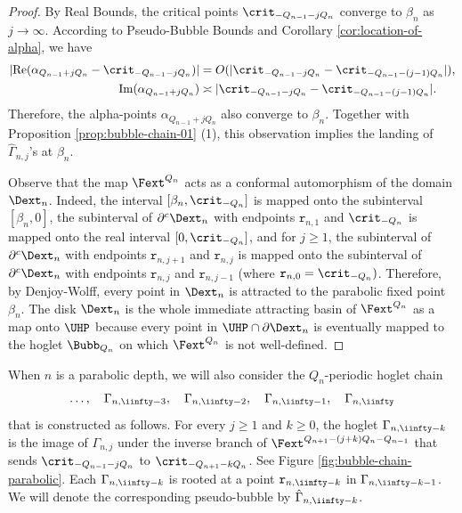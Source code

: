 \documentclass{amsart}
\begin{document}
\begin{proof}
    By Real Bounds, the critical points $\crit_{-Q_{n-1}-jQ_n}$ converge to $\beta_n$ as $j \to \infty$. 
    According to Pseudo-Bubble Bounds and Corollary \ref{cor:location-of-alpha}, we have
    \begin{align*}
        |\text{Re} (\alpha_{Q_{n-1} + j Q_n} - \crit_{-Q_{n-1} - jQ_n})|
        &= O( |\crit_{-Q_{n-1} - jQ_n} - \crit_{-Q_{n-1} - (j-1) Q_n}|), \\
        \text{Im} (\alpha_{Q_{n-1}+ j Q_n}) &\asymp |\crit_{-Q_{n-1} - jQ_n} - \crit_{-Q_{n-1} - (j-1) Q_n}|.
    \end{align*}
    Therefore, the alpha-points $\alpha_{Q_{n-1}+jQ_n}$ also converge to $\beta_n$. 
    Together with Proposition \ref{prop:bubble-chain-01} (1), this observation implies the landing of $\hat{\Gamma}_{n,j}$'s at $\beta_n$. 
    
    Observe that the map $\Fext^{Q_n}$ acts as a conformal automorphism of the domain $\Dext_n$. 
    Indeed, the interval $[\beta_n,\crit_{-Q_n}]$ is mapped onto the subinterval $[\beta_n,0]$, the subinterval of $\partial^c \Dext_n$ with endpoints $\mathtt{r}_{n,1}$ and $\crit_{-Q_n}$ is mapped onto the real interval $[0,\crit_{-Q_n}]$, and for $j \geq 1$, the subinterval of $\partial^c \Dext_n$ with endpoints $\mathtt{r}_{n,{j+1}}$ and $\mathtt{r}_{n,{j}}$ is mapped onto the subinterval of $\partial^c \Dext_n$ with endpoints $\mathtt{r}_{n,{j}}$ and $\mathtt{r}_{n,{j-1}}$ (where $\mathtt{r}_{n,0} = \crit_{-Q_n})$.
    Therefore, by Denjoy-Wolff, every point in $\Dext_n$ is attracted to the parabolic fixed point $\beta_n$. The disk $\Dext_n$ is the whole immediate attracting basin of $\Fext^{Q_n}$ as a map onto $\UHP$ because every point in $\UHP \cap \partial \Dext_n$ is eventually mapped to the hoglet $\Bubb_{Q_n}$ on which $\Fext^{Q_n}$ is not well-defined. 
\end{proof}

When $n$ is a parabolic depth, we will also consider the $Q_n$-periodic hoglet chain
\[
 \ldots, \quad \Gamma_{n,\iinfty-3}, \quad \Gamma_{n,\iinfty-2}, \quad \Gamma_{n,\iinfty-1}, \quad \Gamma_{n,\iinfty}
\]
that is constructed as follows.
For every $j \geq 1$ and $k \geq 0$, the hoglet $\Gamma_{n,\iinfty-k}$ is the image of $\Gamma_{n,j}$ under the inverse branch of $\Fext^{Q_{n+1}-(j+k)Q_n-Q_{n-1}}$ that sends $\crit_{-Q_{n-1}-j Q_n}$ to $\crit_{-Q_{n+1}-kQ_n}$. 
See Figure \ref{fig:bubble-chain-parabolic}.
Each $\Gamma_{n,\iinfty-k}$ is rooted at a point $\mathtt{r}_{n,\iinfty-k}$ in $\Gamma_{n,\iinfty-k-1}$.
We will denote the corresponding pseudo-bubble by $\hat{\Gamma}_{n,\iinfty-k}$.
\end{document}
